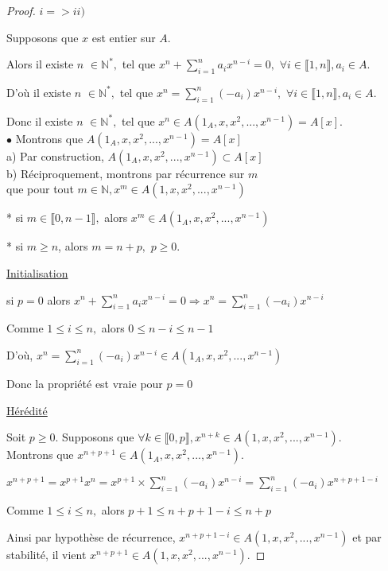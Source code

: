 \begin{proof}
	$i=>ii)$
	
	Supposons que $x$ est entier sur $A.$
	
	Alors il existe $n$ $\in \mathbb{N}^{\ast },$ tel que $x^{n}+\sum\limits_{i=1}^{n}a_{i}x^{n-i}=0,$ $\forall i\in \llbracket 1, n \rrbracket ,a_{i}\in A.$
	
	D'où il existe $n$ $\in \mathbb{N}^{\ast },$ tel que $x^{n}=\sum\limits_{i=1}^{n}(-a_{i})x^{n-i},$ $\forall i\in \llbracket 1, n \rrbracket ,a_{i}\in A.$
	
	Donc il existe $n$ $\in \mathbb{N}^{\ast },$ tel que $x^{n}\in A(1_A,x,x^{2},...,x^{n-1})=A[x].$\\
	$\bullet$ Montrons que $A(1_A,x,x^{2},...,x^{n-1})=A[x]$\\
	a) Par construction, $A(1_A,x,x^{2},...,x^{n-1})\subset A[x]$\\
	b) Réciproquement, montrons par récurrence sur $m$\\ que pour tout $m	\in \mathbb{N},x^{m}\in A(1,x,x^{2},...,x^{n-1})$
	
	* si $m\in \llbracket 0, n-1 \rrbracket ,$ alors $x^{m}\in
	A(1_A,x,x^{2},...,x^{n-1})$
	
	* si $m\geq n$, alors $m=n+p,$ $p\geq 0.$
	
	\underline{Initialisation}
	
	si $p=0$ alors  $x^{n}+\sum\limits_{i=1}^{n}a_{i}x^{n-i}=0\Rightarrow
	x^{n}=\sum\limits_{i=1}^{n}(-a_{i})x^{n-i}$
	
	Comme $1\leq i\leq n,$ alors $0\leq n-i\leq n-1$
	
	D'où, $x^{n}=\sum\limits_{i=1}^{n}(-a_{i})x^{n-i}\in
	A(1_A,x,x^{2},...,x^{n-1})$
	
	Donc la propriété est vraie pour $p=0$
	
	\underline{Hérédité}
	
	Soit $p\geq 0.$ Supposons que $\forall k\in \llbracket 0, p \rrbracket
	,x^{n+k}\in A(1,x,x^{2},...,x^{n-1})$.\\ Montrons que $x^{n+p+1}\in
	A(1_A,x,x^{2},...,x^{n-1}).$
	
	$x^{n+p+1}=x^{p+1}x^{n}=x^{p+1}\times
	\sum\limits_{i=1}^{n}(-a_{i})x^{n-i}=\sum\limits_{i=1}^{n}(-a_{i})x^{n+p+1-i}$
	
	Comme $1\leq i\leq n,$ alors $p+1\leq n+p+1-i\leq n+p$
	
	Ainsi par hypothèse de récurrence, $x^{n+p+1-i}\in
	A(1,x,x^{2},...,x^{n-1})$ et par stabilité, il vient $x^{n+p+1}\in
	A(1,x,x^{2},...,x^{n-1}).$
	

\end{proof}
